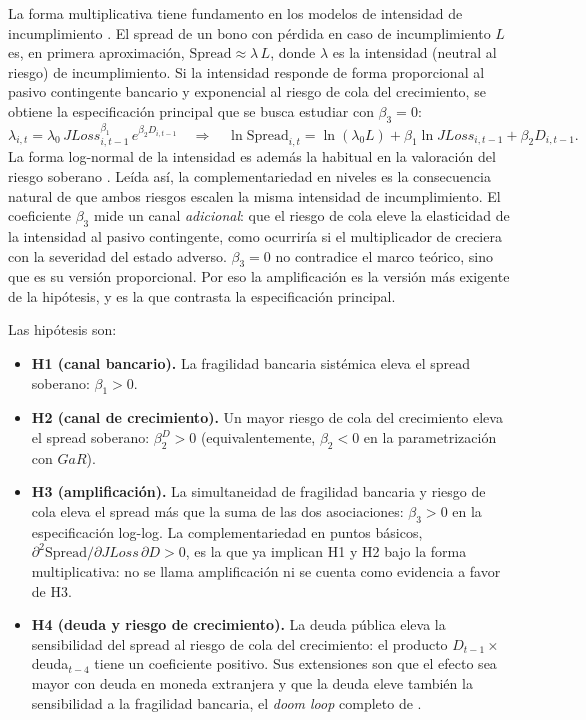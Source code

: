 La forma multiplicativa tiene fundamento en los modelos de intensidad de incumplimiento \citep{DuffieSingleton1999}. El spread de un bono con pérdida en caso de incumplimiento $L$ es, en primera aproximación, $\mathrm{Spread}\approx\lambda\,L$, donde $\lambda$ es la intensidad (neutral al riesgo) de incumplimiento. Si la intensidad responde de forma proporcional al pasivo contingente bancario y exponencial al riesgo de cola del crecimiento, se obtiene la especificación principal que se busca estudiar con $\beta_3=0$:
\[
\lambda_{i,t}=\lambda_0\,JLoss_{i,t-1}^{\beta_1}\,e^{\beta_2D_{i,t-1}}
\quad\Longrightarrow\quad
\ln\mathrm{Spread}_{i,t}=\ln(\lambda_0L)+\beta_1\ln JLoss_{i,t-1}+\beta_2D_{i,t-1}.
\]
La forma log-normal de la intensidad es además la habitual en la valoración del riesgo soberano \citep{PanSingleton2008}. Leída así, la complementariedad en niveles es la consecuencia natural de que ambos riesgos escalen la misma intensidad de incumplimiento. El coeficiente $\beta_3$ mide un canal \emph{adicional}: que el riesgo de cola eleve la elasticidad de la intensidad al pasivo contingente, como ocurriría si el multiplicador de \citet{FarhiTirole2018b} creciera con la severidad del estado adverso. $\beta_3=0$ no contradice el marco teórico, sino que es su versión proporcional. Por eso la amplificación es la versión más exigente de la hipótesis, y es la que contrasta la especificación principal.

Las hipótesis son:

\begin{itemize}
    \item \textbf{H1 (canal bancario).} La fragilidad bancaria sistémica eleva el spread soberano: $\beta_1>0$.
    \item \textbf{H2 (canal de crecimiento).} Un mayor riesgo de cola del crecimiento eleva el spread soberano: $\beta_2^{D}>0$ (equivalentemente, $\beta_2<0$ en la parametrización con $GaR$).
    \item \textbf{H3 (amplificación).} La simultaneidad de fragilidad bancaria y riesgo de cola eleva el spread más que la suma de las dos asociaciones: $\beta_3>0$ en la especificación log-log. La complementariedad en puntos básicos, $\partial^2\mathrm{Spread}/\partial JLoss\,\partial D>0$, es la que ya implican H1 y H2 bajo la forma multiplicativa: no se llama amplificación ni se cuenta como evidencia a favor de H3.
    \item \textbf{H4 (deuda y riesgo de crecimiento).} La deuda pública eleva la sensibilidad del spread al riesgo de cola del crecimiento: el producto $D_{t-1}\times$deuda$_{t-4}$ tiene un coeficiente positivo. Sus extensiones son que el efecto sea mayor con deuda en moneda extranjera y que la deuda eleve también la sensibilidad a la fragilidad bancaria, el \textit{doom loop} completo de \citet{FarhiTirole2018b}.
\end{itemize}

